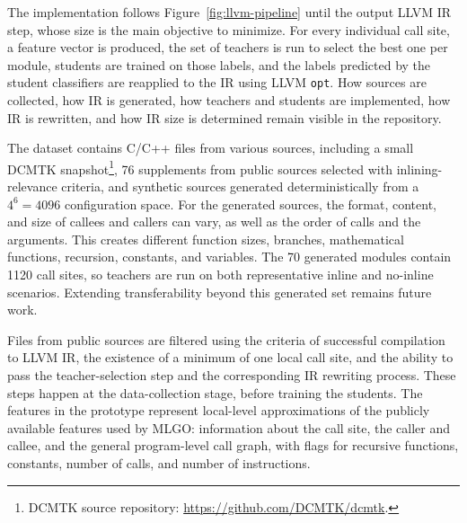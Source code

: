 \documentclass[12pt, a4paper]{report}
\begin{document}
The implementation follows Figure~\ref{fig:llvm-pipeline} until the output LLVM
IR step, whose size is the main objective to minimize. For every individual call
site, a feature vector is produced, the set of teachers is run to select the best
one per module, students are trained on those labels, and the labels predicted
by the student classifiers are reapplied to the IR using LLVM \texttt{opt}. How
sources are collected, how IR is generated, how teachers and students are
implemented, how IR is rewritten, and how IR size is determined remain visible
in the repository.

The dataset contains C/C++ files from various sources, including a small DCMTK
snapshot\footnote{DCMTK source repository:
\url{https://github.com/DCMTK/dcmtk}.}, 76 supplements from public sources
selected with inlining-relevance criteria, and synthetic sources generated
deterministically from a \(4^6 = 4096\) configuration space. For the generated
sources, the format, content, and size of callees and callers can vary, as well
as the order of calls and the arguments. This creates different function sizes,
branches, mathematical functions, recursion, constants, and variables. The 70
generated modules contain 1120 call sites, so teachers are run on both
representative inline and no-inline scenarios. Extending transferability beyond
this generated set remains future work.

Files from public sources are filtered using the criteria of successful
compilation to LLVM IR, the existence of a minimum of one local call site, and
the ability to pass the teacher-selection step and the corresponding IR rewriting
process. These steps happen at the data-collection stage, before training the
students. The features in the prototype represent local-level approximations of
the publicly available features used by MLGO: information about the call site,
the caller and callee, and the general program-level call graph, with flags for
recursive functions, constants, number of calls, and number of instructions.
\end{document}
